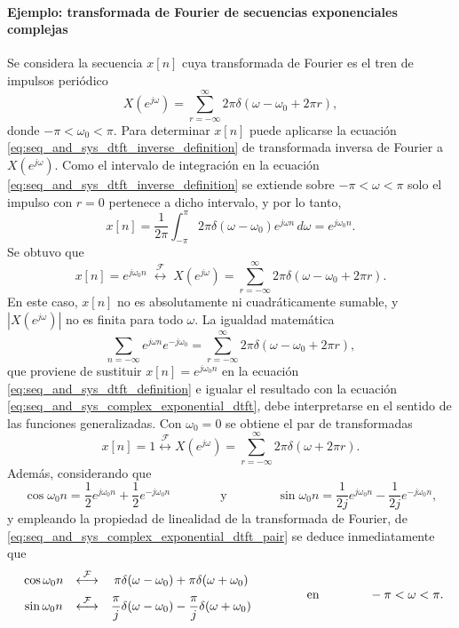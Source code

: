 \documentclass[a4paper]{report}
\begin{document}
\paragraph{Ejemplo: transformada de Fourier de secuencias exponenciales complejas} Se considera la secuencia \(x[n]\) cuya transformada de Fourier es el tren de impulsos periódico
\begin{equation}\label{eq:seq_and_sys_complex_exponential_dtft}
 X(e^{j\omega})=\sum_{r=-\infty}^\infty2\pi\delta(\omega-\omega_0+2\pi r), 
\end{equation}
donde \(-\pi<\omega_0<\pi\). Para determinar \(x[n]\) puede aplicarse la ecuación \ref{eq:seq_and_sys_dtft_inverse_definition} de transformada inversa de Fourier a \(X(e^{j\omega})\). Como el intervalo de integración en la ecuación \ref{eq:seq_and_sys_dtft_inverse_definition} se extiende sobre \(-\pi<\omega<\pi\) solo el impulso con \(r=0\) pertenece a dicho intervalo, y por lo tanto,
\[
 x[n]=\frac{1}{2\pi}\int_{-\pi}^\pi2\pi\delta(\omega-\omega_0)e^{j\omega n}\,d\omega=e^{j\omega_0n}.
\]
Se obtuvo que 
\begin{equation}\label{eq:seq_and_sys_complex_exponential_dtft_pair}
 x[n]=e^{j\omega_0n}\;\overset{\mathcal{F}}{\longleftrightarrow}\;X(e^{j\omega})=\sum_{r=-\infty}^\infty2\pi\delta(\omega-\omega_0+2\pi r). 
\end{equation}
En este caso, \(x[n]\) no es absolutamente ni cuadráticamente sumable, y \(|X(e^{j\omega})|\) no es finita para todo \(\omega\). La igualdad matemática  
\[
 \sum_{n=-\infty}e^{j\omega n}e^{-j\omega_0}=\sum_{r=-\infty}^\infty2\pi\delta(\omega-\omega_0+2\pi r),
\]
que proviene de sustituir \(x[n]=e^{j\omega_0n}\) en la ecuación \ref{eq:seq_and_sys_dtft_definition} e igualar el resultado con la ecuación \ref{eq:seq_and_sys_complex_exponential_dtft}, debe interpretarse en el sentido de las funciones generalizadas. Con \(\omega_0=0\) se obtiene el par de transformadas
\begin{equation}\label{eq:seq_and_sys_constant_dtft_pair}
 x[n]=1\overset{\mathcal{F}}{\longleftrightarrow}X(e^{j\omega})=\sum_{r=-\infty}^\infty2\pi\delta(\omega+2\pi r). 
\end{equation} 
Además, considerando que 
\[
 \cos\omega_0n=\frac{1}{2}e^{j\omega_0n}+\frac{1}{2}e^{-j\omega_0n}
  \qquad\qquad\textrm{y}\qquad\qquad
 \sin\omega_0n=\frac{1}{2j}e^{j\omega_0n}-\frac{1}{2j}e^{-j\omega_0n},
\]
y empleando la propiedad de linealidad de la transformada de Fourier, de \ref{eq:seq_and_sys_complex_exponential_dtft_pair} se deduce inmediatamente que
\begin{equation}\label{eq:seq_and_sys_sin_cos_dtft_pair}
\begin{array}{ccc}
 \cos\omega_0n&\overset{\mathcal{F}}{\longleftrightarrow}&\pi\delta(\omega-\omega_0)+\pi\delta(\omega+\omega_0)\\[\medskipamount]
 \sin\omega_0n&\overset{\mathcal{F}}{\longleftrightarrow}&\dfrac{\pi}{j}\delta(\omega-\omega_0)-\dfrac{\pi}{j}\delta(\omega+\omega_0)
\end{array}
\qquad\qquad\textrm{en}\qquad\qquad
 -\pi<\omega<\pi.
\end{equation}
 
\end{document}
